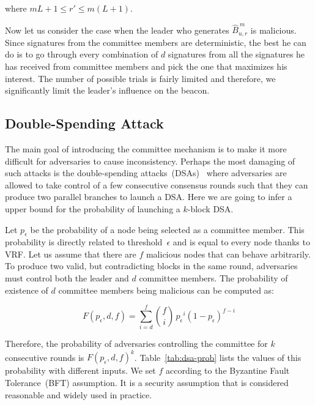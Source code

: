 \documentclass{article}
\begin{document}
where $mL+1\leq r'\leq m(L+1)$.

Now let us consider the case when the leader who generates $\hat{B}_{u,r}^{\,m}$ is malicious. Since signatures from the committee members are deterministic, the best he can do is to go through every combination of $d$ signatures from all the signatures he has received from committee members and pick the one that maximizes his interest. The number of possible trials is fairly limited and therefore, we significantly limit the leader's influence on the beacon.


\subsection{Double-Spending Attack}
The main goal of introducing the committee mechanism is to make it more difficult for adversaries to cause inconsistency. Perhaps the most damaging of such attacks is the double-spending attacks~(DSAs)~\cite{Sat08} where adversaries are allowed to take control of a few consecutive consensus rounds such that they can produce two parallel branches to launch a DSA. Here we are going to infer a upper bound for the probability of launching a $k$-block DSA. 

Let $p_\epsilon$ be the probability of a node being selected as a committee member. This probability is directly related to threshold~$\epsilon$ and is equal to every node thanks to VRF. Let us assume that there are $f$ malicious nodes that can behave arbitrarily. To produce two valid, but contradicting blocks in the same round, adversaries must control both the leader and $d$ committee members. The probability of existence of $d$ committee members being malicious can be computed as:

\begin{equation}
    F(p_\epsilon,d,f) = \sum_{i=d}^f \binom{f}{i}\,{p_\epsilon}^i\left(1-p_\epsilon\right)^{f-i}
\end{equation}

Therefore, the probability of adversaries controlling the committee for $k$ consecutive rounds is $F(p_\epsilon,d,f)^k$. Table~\ref{tab:dsa-prob} lists the values of this probability with different inputs. We set $f$ according to the Byzantine Fault Tolerance~(BFT) assumption. It is a security assumption that is considered reasonable and widely used in practice.
\end{document}
